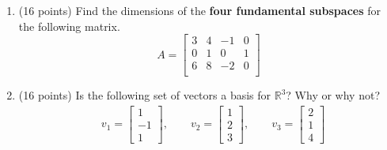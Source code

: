 \documentclass[12pt, a4paper]{article}
\theoremstyle{break}
\begin{document}
\begin{enumerate}
\item (16 points) Find the dimensions of the \textbf{four fundamental subspaces} for the following matrix.
\begin{equation}
A=\begin{bmatrix}
3 & 4 &-1&0 \\
0 & 1 & 0 & 1 \\
6 & 8 &-2 &0 \\
\end{bmatrix} \nonumber
\end{equation}
\newpage

\item (16 points)  Is the following set of vectors a basis for $\mathbb{R}^3$? Why or why not?
\begin{align}
& v_1=\begin{bmatrix} 1 \\ -1 \\ 1 \end{bmatrix}, \qquad v_2=\begin{bmatrix} 1 \\ 2 \\ 3 \end{bmatrix} , \qquad v_3=\begin{bmatrix} 2 \\ 1\\4 \end{bmatrix} \nonumber
\end{align}





\end{enumerate}
\end{document}

